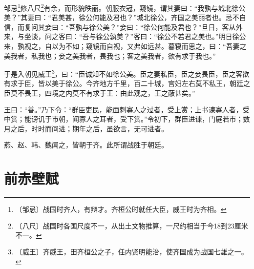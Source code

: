 \documentclass[12pt,UTF-8,openany]{ctexbook}
\begin{document}
\begin{normalsize}
    
    邹忌\footnote{〔邹忌〕战国时齐人，有辩才。齐桓公时就任大臣，威王时为齐相。}修八尺\footnote{〔八尺〕战国时各国尺度不一，从出土文物推算，一尺约相当于今18到23厘米不一。}有余，而形貌昳丽。朝服衣冠，窥镜，谓其妻曰：“我孰与城北徐公美？”其妻曰：“君美甚，徐公何能及君也？”城北徐公，齐国之美丽者也。忌不自信，而复问其妾曰：“吾孰与徐公美？”妾曰：“徐公何能及君也？”旦日，客从外来，与坐谈，问之客曰：“吾与徐公孰美？”客曰：“徐公不若君之美也。”明日徐公来，孰视之，自以为不如；窥镜而自视，又弗如远甚。暮寝而思之，曰：“吾妻之美我者，私我也；妾之美我者，畏我也；客之美我者，欲有求于我也。”
    
    于是入朝见威王\footnote{〔威王〕齐威王，田齐桓公之子，任内贤明能治，使齐国成为战国七雄之一。}，曰：“臣诚知不如徐公美。臣之妻私臣，臣之妾畏臣，臣之客欲有求于臣，皆以美于徐公。今齐地方千里，百二十城，宫妇左右莫不私王，朝廷之臣莫不畏王，四境之内莫不有求于王：由此观之，王之蔽甚矣。”
    
    王曰：“善。”乃下令：“群臣吏民，能面刺寡人之过者，受上赏；上书谏寡人者，受中赏；能谤讥于市朝，闻寡人之耳者，受下赏。”令初下，群臣进谏，门庭若市；数月之后，时时而间进；期年之后，虽欲言，无可进者。
    
    燕、赵、韩、魏闻之，皆朝于齐。此所谓战胜于朝廷。
\end{normalsize}



\chapter{前赤壁赋}
\end{document}
